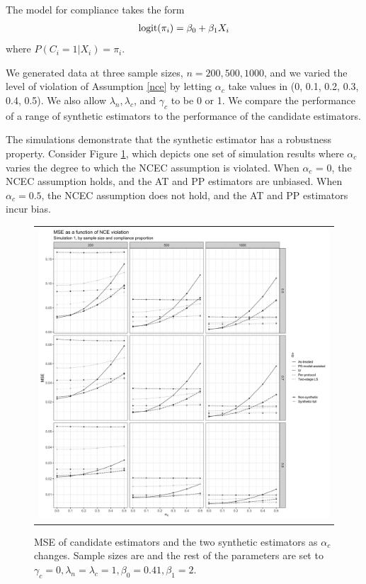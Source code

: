 \documentclass{article}
\begin{document}
The model for compliance takes the form
\begin{align}
\mbox{logit}(\pi_i) = \beta_0 + \beta_1X_i
\end{align}
where $P(C_i = 1 | X_i) = \pi_i$.

We generated data at three sample sizes, $n = 200, 500, 1000$, and we varied the level of violation of Assumption \ref{nce} by letting $\alpha_c$ take values in (0, 0.1, 0.2, 0.3, 0.4, 0.5).  We also allow $\lambda_n, \lambda_c$, and $\gamma_c$ to be 0 or 1. We compare the performance of a range of synthetic estimators to the performance of the candidate estimators.

The simulations demonstrate that the synthetic estimator has a robustness property. Consider Figure \ref{mse_plot_1}, which depicts one set of simulation results where $\alpha_c$ varies the degree to which the NCEC assumption is violated. When $\alpha_c$ = 0, the NCEC assumption holds, and the AT and PP estimators are unbiased. When $\alpha_c = 0.5$, the NCEC assumption does not hold, and the AT and PP estimators incur bias. 
%
\begin{figure}
\centering
\begin{tabular}{c}
\includegraphics[width =\textwidth]{figures/main-sim-mse-plot.png}
\end{tabular}\vspace{0.2in}
\caption{MSE of candidate estimators and the two synthetic estimators as $\alpha_c$ changes. Sample sizes are  and the rest of the parameters are set to $\gamma_c = 0, \lambda_n = \lambda_c = 1, \beta_0 = 0.41, \beta_1 = 2$.}\label{mse_plot_1}
\end{figure}
\end{document}
